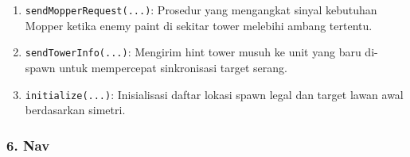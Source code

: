 \begin{enumerate}
	\item \texttt{sendMopperRequest(...)}:
	      Prosedur yang mengangkat sinyal kebutuhan Mopper ketika enemy paint di sekitar tower melebihi ambang tertentu.

	\item \texttt{sendTowerInfo(...)}:
	      Mengirim hint tower musuh ke unit yang baru di-spawn untuk mempercepat sinkronisasi target serang.

	\item \texttt{initialize(...)}:
	      Inisialisasi daftar lokasi spawn legal dan target lawan awal berdasarkan simetri.
\end{enumerate}

\subsubsection{6. Nav}
